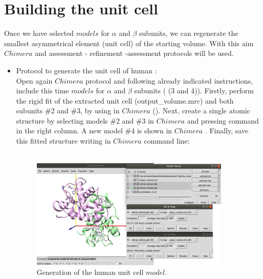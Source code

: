 
\section{Building the unit cell}
\label{buildingunitcell}

Once we have selected $models$ for  $\alpha$ and $\beta$ subunits, we can regenerate the smallest asymmetrical element (unit cell) of the starting volume. With this aim $Chimera$  and assessment - refinement -assessment protocols will be used.\\ 

\begin{itemize}
 \item Protocol  to generate the unit cell of human :\\
 
    Open again $Chimera$  protocol and following already indicated instructions, include this time $models$ for  $\alpha$ and $\beta$ subunits ( (3 and 4)). Firstly, perform the rigid fit of the extracted unit cell (output\_volume.mrc) and both subunits \#2 and \#3, by using  in $Chimera$ (). Next, create a single atomic structure by selecting models \#2 and \#3 in $Chimera$  and pressing  command in the right column. A new model \#4 is shown in $Chimera$ . Finally, save this fitted structure writing in $Chimera$ command line:\\
    \\
    
    \begin{figure}[H]
    \centering 
    \captionsetup{width=.7\linewidth} 
    \includegraphics[width=0.90\textwidth]{Images/Fig40}
    \caption{Generation of the human  unit cell $model$.}
    \label{fig:chimera_rigid_fit_A_B}
   \end{figure}
    

\end{itemize}
